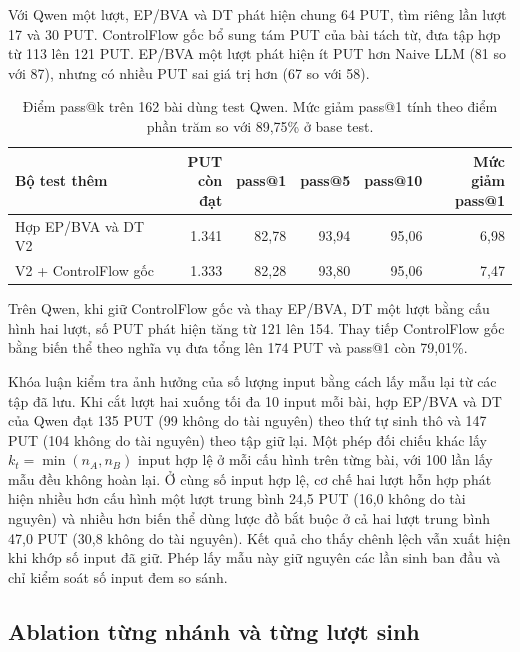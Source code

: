 Với Qwen một lượt, EP/BVA và DT phát hiện chung 64 PUT, tìm riêng lần lượt 17 và 30 PUT. ControlFlow gốc bổ sung tám PUT của bài tách từ, đưa tập hợp từ 113 lên 121 PUT. EP/BVA một lượt phát hiện ít PUT hơn Naive LLM (81 so với 87), nhưng có nhiều PUT sai giá trị hơn (67 so với 58).

\begin{table}[!htbp]
\centering
\caption[Điểm pass@k với V2 và ControlFlow gốc dùng Qwen]{Điểm pass@k trên 162 bài dùng test Qwen. Mức giảm pass@1 tính theo điểm phần trăm so với 89,75\% ở base test.}
\label{tab:ablation-one-pass-scores}
\small
\begin{tabular*}{\linewidth}{@{\extracolsep{\fill}}lrrrrr@{}}
\toprule
Bộ test thêm & \shortstack[r]{PUT\\còn đạt} & pass@1 & pass@5 & pass@10 & \shortstack[r]{Mức giảm\\pass@1} \\
\midrule
Hợp EP/BVA và DT V2 & 1.341 & 82,78 & 93,94 & 95,06 & 6,98 \\
V2 + ControlFlow gốc & 1.333 & 82,28 & 93,80 & 95,06 & 7,47 \\
\bottomrule
\end{tabular*}
\end{table}

Trên Qwen, khi giữ ControlFlow gốc và thay EP/BVA, DT một lượt bằng cấu hình hai lượt, số PUT phát hiện tăng từ 121 lên 154. Thay tiếp ControlFlow gốc bằng biến thể theo nghĩa vụ đưa tổng lên 174 PUT và pass@1 còn 79,01\%.

Khóa luận kiểm tra ảnh hưởng của số lượng input bằng cách lấy mẫu lại từ các tập đã lưu. Khi cắt lượt hai xuống tối đa 10 input mỗi bài, hợp EP/BVA và DT của Qwen đạt 135 PUT (99 không do tài nguyên) theo thứ tự sinh thô và 147 PUT (104 không do tài nguyên) theo tập giữ lại. Một phép đối chiếu khác lấy \(k_t=\min(n_A,n_B)\) input hợp lệ ở mỗi cấu hình trên từng bài, với 100 lần lấy mẫu đều không hoàn lại. Ở cùng số input hợp lệ, cơ chế hai lượt hỗn hợp phát hiện nhiều hơn cấu hình một lượt trung bình 24,5 PUT (16,0 không do tài nguyên) và nhiều hơn biến thể dùng lược đồ bắt buộc ở cả hai lượt trung bình 47,0 PUT (30,8 không do tài nguyên). Kết quả cho thấy chênh lệch vẫn xuất hiện khi khớp số input đã giữ. Phép lấy mẫu này giữ nguyên các lần sinh ban đầu và chỉ kiểm soát số input đem so sánh.

\subsection{Ablation từng nhánh và từng lượt sinh}
\label{sec:ablation}


